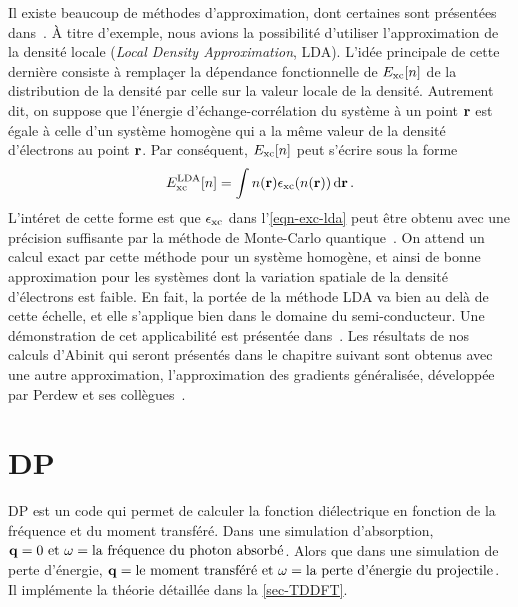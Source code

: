 Il existe beaucoup de méthodes d'approximation,
dont certaines sont présentées dans~\cite{Sottile2003}.
À titre d'exemple,
nous avions la possibilité d'utiliser l'approximation de la densité locale (\textit{Local Density Approximation}, LDA).
L'idée principale de cette dernière consiste à remplaçer la dépendance fonctionnelle de $E_{\textnormal{xc}}[n]$
de la distribution de la densité par celle sur la valeur locale de la densité.
Autrement dit, on suppose que l'énergie d'échange-corrélation du système à un point $\vb{r}$
est égale à celle d'un système homogène qui a la même valeur de la densité d'électrons au point $\vb{r}$.
Par conséquent, $E_{\textnormal{xc}}[n]$ peut s'écrire sous la forme
\begin{equation}
  \label{eqn-exc-lda}
  E_{\textnormal{xc}}^{\textnormal{LDA}}[n] = \int n(\vb{r})\epsilon_{\textnormal{xc}}(n(\vb{r})) \dd{\vb{r}}.
\end{equation}
L'intéret de cette forme est que $\epsilon_{\textnormal{xc}}$ dans l'\cref{eqn-exc-lda} peut être obtenu avec
une précision suffisante par la méthode de Monte-Carlo quantique~\cite{ceperley1980}.
On attend un calcul exact par cette méthode pour un système homogène,
et ainsi de bonne approximation pour les systèmes dont la variation spatiale de la densité d'électrons est faible.
En fait, la portée de la méthode LDA va bien au delà de cette échelle,
et elle s'applique bien dans le domaine du semi-conducteur.
Une démonstration de cet applicabilité est présentée dans~\cite{Sottile2003}.
Les résultats de nos calculs d'Abinit qui seront présentés dans le chapitre suivant sont obtenus
avec une autre approximation, l'approximation des gradients généralisée,
développée par Perdew et ses collègues~\cite{Langreth1980, Perdew1986, Perdew1992}.

\section{DP}
DP est un code qui permet de calculer la fonction diélectrique
en fonction de la fréquence et du moment transféré.
Dans une simulation d'absorption,
$\vb{q}=0 \text{ et } \omega = \text{la fréquence du photon absorbé}$.
Alors que dans une simulation de perte d'énergie,
$\vb{q}= \text{le moment transféré et } \omega = \text{la perte d'énergie du projectile}$.
Il implémente la théorie détaillée dans la \cref{sec-TDDFT}.

